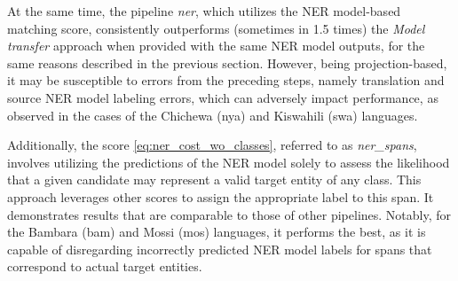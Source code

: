 At the same time, the pipeline \textit{ner}, which utilizes the NER model-based matching
score, consistently outperforms (sometimes in 1.5 times) the \textit{Model transfer} approach when provided with the same
NER model outputs, for the same reasons described in the previous section. However,
being projection-based, it may be susceptible to errors from the preceding steps, namely
translation and source NER model labeling errors, which can adversely impact performance,
as observed in the cases of the Chichewa (nya) and Kiswahili (swa) languages.

Additionally, the score \eqref{eq:ner_cost_wo_classes}, referred to as \textit{ner\_spans},
involves utilizing the predictions of the NER model solely to assess the likelihood
that a given candidate may represent a valid target entity of any class. This approach
leverages other scores to assign the appropriate label to this span.
It demonstrates results that are comparable to those of other pipelines.
Notably, for the Bambara (bam) and Mossi (mos) languages, it performs the best, as
it is capable of disregarding incorrectly predicted NER model labels for spans that
correspond to actual target entities.
